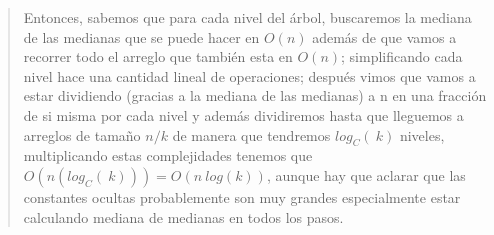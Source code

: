 \begin{quote}
    Entonces, sabemos que para cada nivel del árbol, buscaremos la mediana de las medianas que se puede hacer en $O(n)$ además de que vamos a recorrer todo el arreglo que también esta en $O(n)$; simplificando cada nivel hace una cantidad lineal de operaciones; después vimos que vamos a estar dividiendo (gracias a la mediana de las medianas) a n en una fracción de si misma por cada nivel y además dividiremos hasta que lleguemos a arreglos de tamaño $n/k$ de manera que tendremos $log_C(\ k)$ niveles, multiplicando estas complejidades tenemos que $O(n(log_C(\ k))) = O(n \ log(k))$, aunque hay que aclarar que las constantes ocultas probablemente son muy grandes especialmente estar calculando mediana de medianas en todos los pasos.\\
\end{quote}